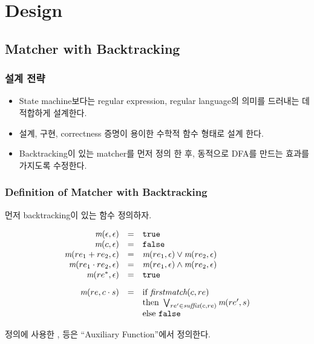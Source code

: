\section{Design}

\subsection{Matcher with Backtracking}

\begin{frame}
    \frametitle{설계 전략}

    \begin{itemize}
    \item State machine보다는 regular expression, regular language의 의미를
        드러내는 데 적합하게 설계한다.
    \item 설계, 구현, correctness 증명이 용이한 수학적 함수 형태로 설계 한다.
    \item Backtracking이 있는 matcher를 먼저 정의 한 후, 
    동적으로 DFA를 만드는 효과를 가지도록 수정한다.
    \end{itemize}
\end{frame}


\begin{frame}
    \frametitle{Definition of Matcher \M{} with Backtracking}

먼저 backtracking이 있는 함수  정의하자.

\[
\begin{array}{rcl}
  \rmatch{\e}{\e} & = & \T \nonumber \\
  \rmatch{\e}{c} & = & \F \nonumber \\
  \rmatch{\e}{\replus} & = & \rmatch{\e}{\rone}\vee\rmatch{\e}{\rtwo}
  \nonumber\\
  \rmatch{\e}{\retimes} & = & \rmatch{\e}{\rone}\wedge\rmatch{\e}{\rtwo} \nonumber \\
  \rmatch{\e}{\restar} & = & \T \nonumber \\[2ex]
  \rmatch{\cs}{re} & = & \mrm{if } \firstmatch(c,re)  \\
                   &   & \mrm{then } \bigvee_{re'\in\suffix(c,re)}\rmatch{s}{re'} \\
                   &   & \mrm{else } \F
\end{array}
\]

 정의에 사용한 \suffix, \firstmatch 등은 ``Auxiliary
Function''에서 정의한다.
\end{frame}

